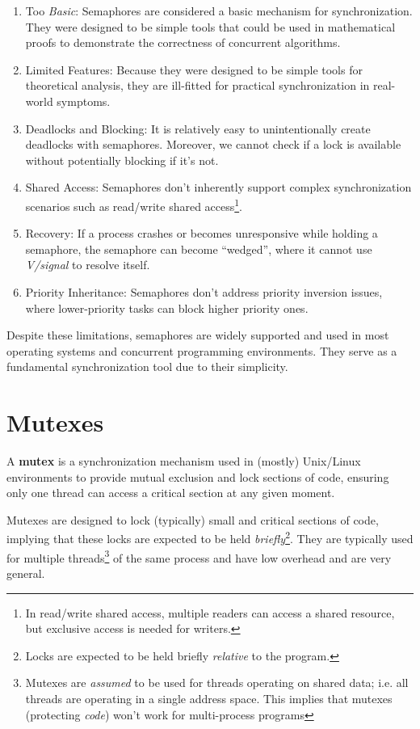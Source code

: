 \documentclass{report}
\newcommand{\definitionBegin}[1]{\begin{tcolorbox}[title={Definition: #1}]}
\newcommand{\definitionEnd}{\end{tcolorbox}}
\begin{document}
\begin{enumerate}[label=\textit{(\roman*)}]
\item Too \textit{Basic}: Semaphores are considered a basic mechanism for synchronization. They were
  designed to be simple tools that could be used in mathematical proofs to demonstrate the
  correctness of concurrent algorithms.
\item Limited Features: Because they were designed to be simple tools for theoretical analysis, they are
  ill-fitted for practical synchronization in real-world symptoms.
\item Deadlocks and Blocking: It is relatively easy to unintentionally create deadlocks with
  semaphores. Moreover, we cannot check if a lock is available without potentially blocking if
  it's not.
\item Shared Access: Semaphores don't inherently support complex synchronization scenarios such as
  read/write shared access\footnote{In read/write shared access, multiple readers can access a
    shared resource, but exclusive access is needed for writers.}.
\item Recovery: If a process crashes or becomes unresponsive while holding a semaphore, the
  semaphore can become ``wedged'', where it cannot use \textit{V/signal} to resolve itself.
\item Priority Inheritance: Semaphores don't address priority inversion issues, where lower-priority
  tasks can block higher priority ones.
\end{enumerate}
Despite these limitations, semaphores are widely supported and used in most operating systems and
concurrent programming environments. They serve as a fundamental synchronization tool due to their simplicity.





\section{Mutexes}
\definitionBegin{Mutex}
A \textbf{mutex} is a synchronization mechanism used in (mostly) Unix/Linux environments to provide
mutual exclusion and lock sections of code, ensuring only one thread can access a critical section
at any given moment. 
\definitionEnd

Mutexes are designed to lock (typically) small and critical sections of code, implying that these
locks are expected to be held \textit{briefly}\footnote{Locks are expected to be held briefly
  \textit{relative} to the program.}. They are typically used for multiple threads\footnote{Mutexes
  are \textit{assumed} to be used for threads operating on shared data; i.e. all threads are operating
  in a single address space. This implies that mutexes (protecting \textit{code}) won't work for
  multi-process programs} of the same process and have low overhead and are very general.
\end{document}
